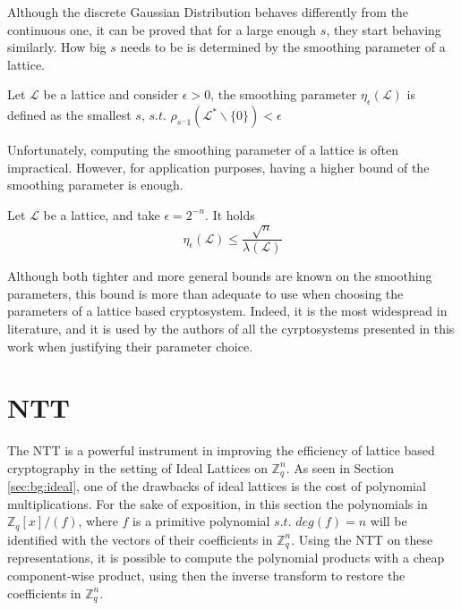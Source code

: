 \begin{remark}
Although the discrete Gaussian Distribution behaves differently from the continuous one, it can be proved that for a large enough $s$, they start behaving similarly. How big $s$ needs to be is determined by the smoothing parameter of a lattice.
\end{remark}

\begin{definition}
Let $\mathscr{L}$ be a lattice and consider $\epsilon>0$, the smoothing parameter $\eta_\epsilon(\mathscr{L})$ is defined as the smallest $s$, $s.t.$ $\rho_{s^-1}(\mathscr{L}^*\backslash\{0\})<\epsilon$
\end{definition}

Unfortunately, computing the smoothing parameter of a lattice is often impractical. However, for application purposes, having a higher bound of the smoothing parameter is enough.

\begin{theorem}
Let $\mathscr{L}$ be a lattice, and take $\epsilon=2^{-n}$. It holds
\begin{equation*}
\eta_\epsilon(\mathscr{L})\leq\frac{\sqrt{n}}{\lambda\left(\mathscr{L}\right)}
\end{equation*}
\end{theorem}

Although both tighter and more general bounds are known on the smoothing parameters, this bound is more than adequate to use when choosing the parameters of a lattice based cryptosystem. Indeed, it is the most widespread in literature, and it is used by the authors of all the cyrptosystems presented in this work when justifying their parameter choice.

\section{NTT}\label{sec:bg:ntt}

The NTT is a powerful instrument in improving the efficiency of lattice based cryptography in the setting of Ideal Lattices on $\mathbb{Z}_q^n$. As seen in Section \ref{sec:bg:ideal}, one of the drawbacks of ideal lattices is the cost of polynomial multiplications. For the sake of exposition, in this section the polynomials in $\mathbb{Z}_q[x]/(f)$, where $f$ is a primitive polynomial $s.t.$ $deg(f)=n$ will be identified with the vectors of their coefficients in $\mathbb{Z}_q^n$. Using the NTT on these representations, it is possible to compute the polynomial products with a cheap component-wise product, using then the inverse transform to restore the coefficients in $\mathbb{Z}_q^n$.\\

